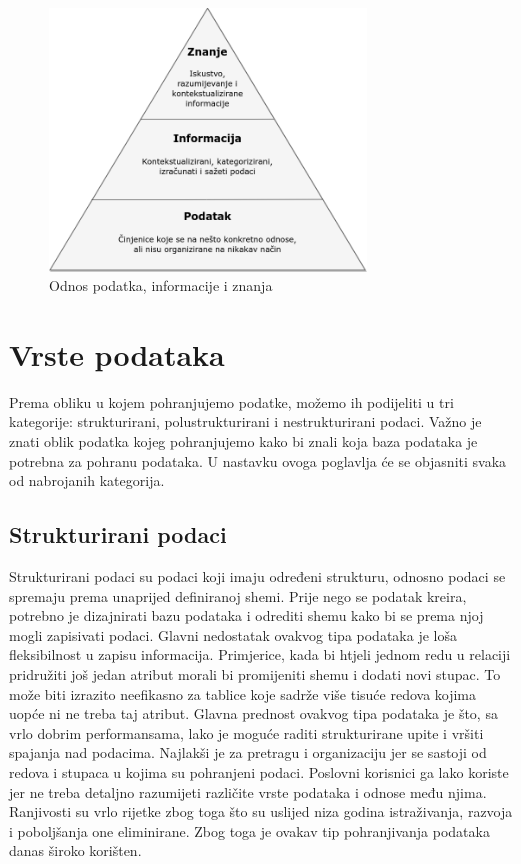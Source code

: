 \documentclass{foi}
\begin{document}
\begin{figure}[h!]
    \centering
    \includegraphics[width=0.75\textwidth]{slike/znanjeinfopodatak.png}
    \caption{Odnos podatka, informacije i znanja \cite{diwdiagram}}
    \label{znanjeinfopodatak}
\end{figure}

\section{Vrste podataka}

Prema obliku u kojem pohranjujemo podatke, možemo ih podijeliti u tri kategorije: strukturirani, polustrukturirani i nestrukturirani podaci. Važno je znati oblik podatka kojeg pohranjujemo kako bi znali koja baza podataka je potrebna za pohranu podataka. \cite{dataEngineerStudyGuide}  U nastavku ovoga poglavlja će se objasniti svaka od nabrojanih kategorija.

\subsection{Strukturirani podaci}

Strukturirani podaci su podaci koji imaju određeni strukturu, odnosno podaci se spremaju prema unaprijed definiranoj shemi. Prije nego se podatak kreira, potrebno je dizajnirati bazu podataka i odrediti shemu kako bi se prema njoj mogli zapisivati podaci. Glavni nedostatak ovakvog tipa podataka je loša fleksibilnost u zapisu informacija. Primjerice, kada bi htjeli jednom redu u relaciji pridružiti još jedan atribut morali bi promijeniti shemu i dodati novi stupac. To može biti izrazito neefikasno za tablice koje sadrže više tisuće redova kojima uopće ni ne treba taj atribut. Glavna prednost ovakvog tipa podataka je što, sa vrlo dobrim performansama, lako je moguće raditi strukturirane upite i vršiti spajanja nad podacima. Najlakši je za pretragu i organizaciju jer se sastoji od redova i stupaca u kojima su pohranjeni podaci. Poslovni korisnici ga lako koriste jer ne treba detaljno razumijeti različite vrste podataka i odnose među njima. Ranjivosti su vrlo rijetke zbog toga što su uslijed niza godina istraživanja, razvoja i poboljšanja one eliminirane. Zbog toga je ovakav tip pohranjivanja podataka danas široko korišten. \cite{unstructuredStructuredSemiStructured}
\end{document}
